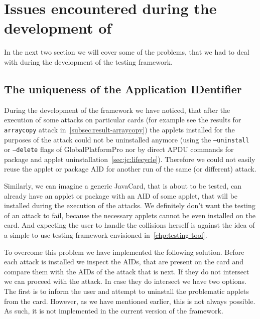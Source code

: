 

    \section{Issues encountered during the development of \javus}
        In the next two section we will cover some of the problems, that we had to deal with during the development of the testing framework.
        
        \subsection{The uniqueness of the Application IDentifier}\label{sec:uniq-aid}
        During the development of the framework we have noticed, that after the execution of some attacks on particular cards (for example see the results for \texttt{arraycopy} attack in~\ref{subsec:result-arraycopy}) the applets installed for the purposes of the attack could not be uninstalled anymore (using the \texttt{--uninstall} or \texttt{--delete} flags of GlobalPlatformPro nor by direct APDU commands for package and applet uninstallation~\ref{sec:jc:lifecycle}). Therefore we could not easily reuse the applet or package AID for another run of the same (or different) attack.

        Similarly, we can imagine a generic JavaCard, that is about to be tested, can already have an applet or package with an AID of some applet, that will be installed during the execution of the attacks. We definitely don't want the testing of an attack to fail, because the necessary applets cannot be even installed on the card. And expecting the user to handle the collisions herself is against the idea of a simple to use testing framework envisioned in~\ref{chp:testing-tool}.

            To overcome this problem we have implemented the following solution. Before each attack is installed we inspect the AIDs, that are present on the card and compare them with the AIDs of the attack that is next. If they do not intersect we can proceed with the attack. In case they do intersect we have two options. The first is to inform the user and attempt to uninstall the problematic applets from the card. However, as we have mentioned earlier, this is not always possible. As such, it is not implemented in the current version of the framework.

